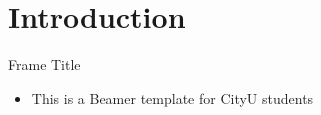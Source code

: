 \section{Introduction}

\begin{frame}{Frame Title}
    \begin{itemize}
        \item This is a Beamer template for CityU students
    \end{itemize}
\end{frame}
